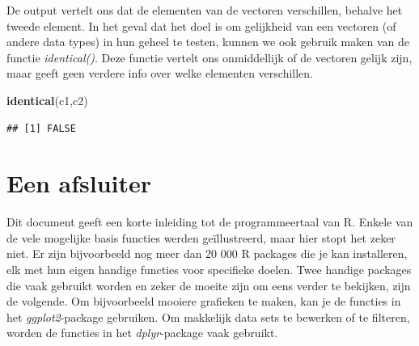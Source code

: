 \documentclass[
]{book}
\newenvironment{Shaded}{\begin{snugshade}}{\end{snugshade}}
\newcommand{\FunctionTok}[1]{\textcolor[rgb]{0.13,0.29,0.53}{\textbf{#1}}}
\newcommand{\NormalTok}[1]{#1}
\begin{document}
De output vertelt ons dat de elementen van de vectoren verschillen, behalve het tweede element. In het geval dat het doel is om gelijkheid van een vectoren (of andere data types) in hun geheel te testen, kunnen we ook gebruik maken van de functie \emph{identical()}. Deze functie vertelt ons onmiddellijk of de vectoren gelijk zijn, maar geeft geen verdere info over welke elementen verschillen.

\begin{Shaded}
\begin{Highlighting}[]
\FunctionTok{identical}\NormalTok{(c1,c2)}
\end{Highlighting}
\end{Shaded}

\begin{verbatim}
## [1] FALSE
\end{verbatim}

\hypertarget{een-afsluiter}{%
\chapter{Een afsluiter}\label{een-afsluiter}}

Dit document geeft een korte inleiding tot de programmeertaal van R. Enkele van de vele mogelijke basis functies werden geïllustreerd, maar hier stopt het zeker niet. Er zijn bijvoorbeeld nog meer dan 20 000 R packages die je kan installeren, elk met hun eigen handige functies voor specifieke doelen. Twee handige packages die vaak gebruikt worden en zeker de moeite zijn om eens verder te bekijken, zijn de volgende. Om bijvoorbeeld mooiere grafieken te maken, kan je de functies in het \emph{ggplot2}-package gebruiken. Om makkelijk data sets te bewerken of te filteren, worden de functies in het \emph{dplyr}-package vaak gebruikt.
\end{document}
